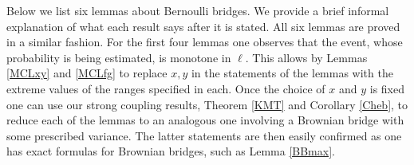Below we list six lemmas about Bernoulli bridges. We provide a brief informal explanation of what each result says after it is stated. All six lemmas are proved in a similar fashion. For the first four lemmas one observes that the event, whose probability is being estimated, is monotone in $\ell$. This allows by Lemmas \ref{MCLxy} and \ref{MCLfg} to replace $x,y$ in the statements of the lemmas with the extreme values of the ranges specified in each. Once the choice of $x$ and $y$ is fixed one can use our strong coupling results, Theorem \ref{KMT} and Corollary \ref{Cheb}, to reduce each of the lemmas to an analogous one involving a Brownian bridge with some prescribed variance. The latter statements are then easily confirmed as one has exact formulas for Brownian bridges, such as Lemma \ref{BBmax}.\\

